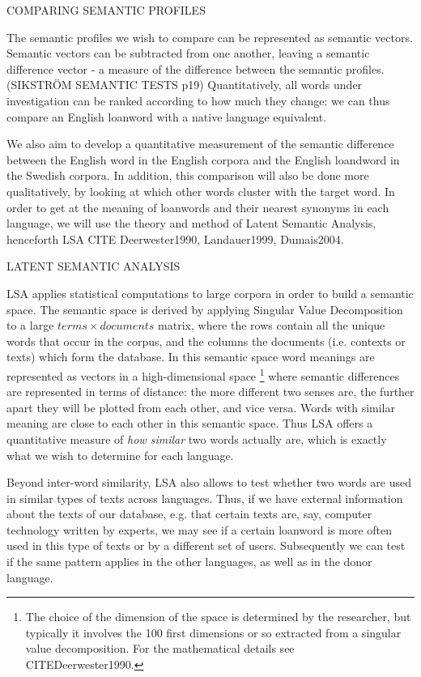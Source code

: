 \documentclass[a4paper]{article}
\begin{document}
COMPARING SEMANTIC PROFILES

The semantic profiles we wish to compare can be represented as semantic vectors. Semantic vectors can be subtracted from one another, leaving a semantic difference vector - a measure of the difference between the semantic profiles.(SIKSTRÖM SEMANTIC TESTS p19) Quantitatively, all words under investigation can be ranked according to how much they change: we can thus compare an English loanword with a native language equivalent. 

We also aim to develop a quantitative measurement of the semantic difference between the English word in the English corpora and the English loandword in the Swedish corpora. In addition, this comparison will also be done more qualitatively, by looking at which other words cluster with the target word. 
In order to get at the meaning of loanwords and their nearest synonyms in each language, we will use the theory and method of Latent Semantic Analysis, henceforth LSA CITE {Deerwester1990, Landauer1999, Dumais2004}.

LATENT SEMANTIC ANALYSIS

LSA applies statistical computations to large corpora in order to build a semantic space.
The semantic space is derived by applying Singular Value Decomposition to a large $ terms \times documents$ matrix, where the rows contain all the unique words that occur in the corpus, and the columns the documents (i.e. contexts or texts) which form the database.
In this semantic space word meanings are represented as vectors in a high-dimensional space%
\footnote{The choice of the dimension of the space is determined by the researcher, but typically it involves the 100 first dimensions or so extracted from a singular value decomposition. For the mathematical details see CITE{Deerwester1990}.} where semantic differences are represented in terms of distance: the more different two senses are, the further apart they will be plotted from each other, and vice versa. Words with similar meaning are close to each other in this semantic space.
Thus LSA offers a quantitative measure of \emph{how similar} two words actually are, which is exactly what we wish to determine for each language.

Beyond inter-word similarity, LSA also allows  to test whether two words are used in similar types of texts across languages.
Thus, if we have external information about the texts of our database, e.g. that certain texts are, say, computer technology written by experts, we may see if a certain loanword is more often used in this type of texts or by a different set of users.
Subsequently we can test if the same pattern applies in the other languages, as well as in the donor language.
\end{document}
